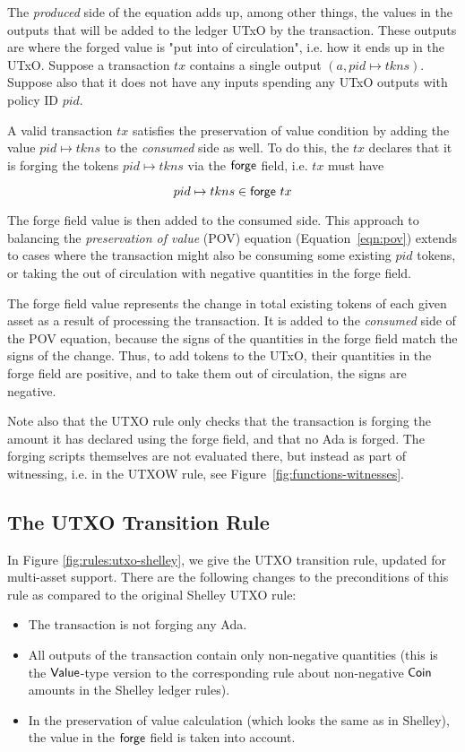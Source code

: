 The \textit{produced} side of the equation adds up, among other things, the
values in the
outputs that will be added to the ledger UTxO by the transaction. These outputs are
where the
forged value is "put into of circulation", i.e. how it ends up in the UTxO.
Suppose a transaction $tx$ contains a single output $(a, pid \mapsto tkns)$. Suppose
also that it does not
have any inputs spending any UTxO outputs with policy ID $pid$.

A valid transaction $tx$ satisfies the preservation of value
condition by adding the value $pid \mapsto tkns$ to the \textit{consumed} side as well.
To do this, the $tx$ declares that it is forging the tokens $pid \mapsto tkns$
via the $\mathsf{forge}$ field, i.e. $tx$ must have

\[pid \mapsto tkns\in\mathsf{forge}~tx\]

The forge field value is then added to the consumed side. This approach
to balancing the \emph{preservation of value} (POV) equation (Equation~\ref{eqn:pov}) extends
to cases where the transaction might also be consuming some existing $pid$ tokens,
or taking the out of circulation with negative quantities in the forge field.

The forge field value represents the change in total existing tokens of each given asset
as a result of processing the transaction. It is added to the
\textit{consumed} side of the POV equation, because the signs of the
quantities in the forge field match the signs of the change. Thus, to add tokens to the UTxO,
their quantities in the forge field are positive, and to
take them out of circulation, the signs are negative.

Note also that the UTXO rule only checks that the transaction is forging the
amount it has declared using the forge field, and that no Ada is forged.
The forging scripts themselves are not evaluated there, but instead
as part of witnessing, i.e. in the UTXOW rule, see Figure~\ref{fig:functions-witnesses}.

\subsection*{The UTXO Transition Rule}
In Figure \ref{fig:rules:utxo-shelley}, we give the UTXO transition rule,
updated for multi-asset support. There are the following changes to the preconditions
of this rule as compared to the original Shelley UTXO rule:

\begin{itemize}
  \item The transaction is not forging any Ada.

  \item All outputs of the transaction contain only non-negative quantities
  (this is the $\mathsf{Value}$-type version to the corresponding rule about non-negative
  $\mathsf{Coin}$ amounts in the Shelley ledger rules).

  \item In the preservation of value calculation (which looks the same as in
  Shelley), the value in the $\mathsf{forge}$ field is taken into account.
\end{itemize}

